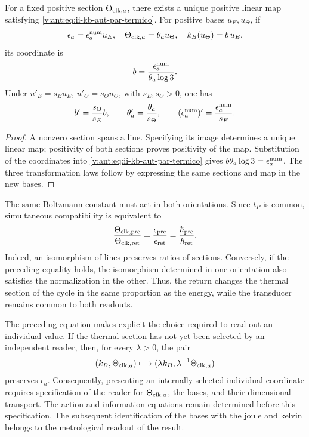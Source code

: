 \begin{theorem}
For a fixed positive section \(\Theta_{{\rm clk},a}\), there exists a
unique positive linear map satisfying
\eqref{v:ant:eq:ii-kb-aut-par-termico}. For positive bases \(u_E,u_\Theta\),
if
\[
 \epsilon_a=\epsilon_a^{\rm num}u_E,\quad
 \Theta_{{\rm clk},a}=\theta_a u_\Theta,\quad
 k_B(u_\Theta)=b\,u_E,
\]
its coordinate is
\begin{equation}
 b=\frac{\epsilon_a^{\rm num}}{\theta_a\log3}.
 \label{v:ant:eq:ii-kb-aut-coordenada}
\end{equation}
Under \(u'_E=s_Eu_E\), \(u'_\Theta=s_\Theta u_\Theta\), with
\(s_E,s_\Theta>0\), one has
\[
 b'=\frac{s_\Theta}{s_E}b,\qquad
 \theta'_a=\frac{\theta_a}{s_\Theta},\qquad
 (\epsilon_a^{\rm num})'=\frac{\epsilon_a^{\rm num}}{s_E}.
\]
\end{theorem}
\begin{proof}
A nonzero section spans a line. Specifying its image determines
a unique linear map; positivity of both sections proves
positivity of the map. Substitution of the coordinates into
\eqref{v:ant:eq:ii-kb-aut-par-termico} gives
\(b\theta_a\log3=\epsilon_a^{\rm num}\). The three transformation
laws follow by expressing the same sections and map
in the new bases.
\end{proof}

The same Boltzmann constant must act in both orientations.
Since \(t_P\) is common, simultaneous compatibility is equivalent to
\begin{equation}
 \frac{\Theta_{{\rm clk},{\rm pre}}}{\Theta_{{\rm clk},{\rm ret}}}
 =\frac{\epsilon_{\rm pre}}{\epsilon_{\rm ret}}
 =\frac{\hbar_{\rm pre}}{\hbar_{\rm ret}}.
 \label{v:ant:eq:ii-kb-aut-orientaciones}
\end{equation}
Indeed, an isomorphism of lines preserves ratios of sections.
Conversely, if the preceding equality holds, the isomorphism
determined in one orientation also satisfies the normalization in
the other. Thus, the return changes the thermal section of the cycle
in the same proportion as the energy, while the transducer remains
common to both readouts.

The preceding equation makes explicit the choice required to read out an
individual value. If the thermal section has not yet been selected
by an independent reader, then, for every \(\lambda>0\), the pair
\[
 (k_B,\Theta_{{\rm clk},a})
 \longmapsto(\lambda k_B,\lambda^{-1}\Theta_{{\rm clk},a})
\]
preserves \(\epsilon_a\). Consequently, presenting an
internally selected individual coordinate requires specification of the reader for
\(\Theta_{{\rm clk},a}\), the bases, and their dimensional transport.
The action and information equations remain determined before
this specification. The subsequent identification of the bases with
the joule and kelvin belongs to the metrological readout of the result.

